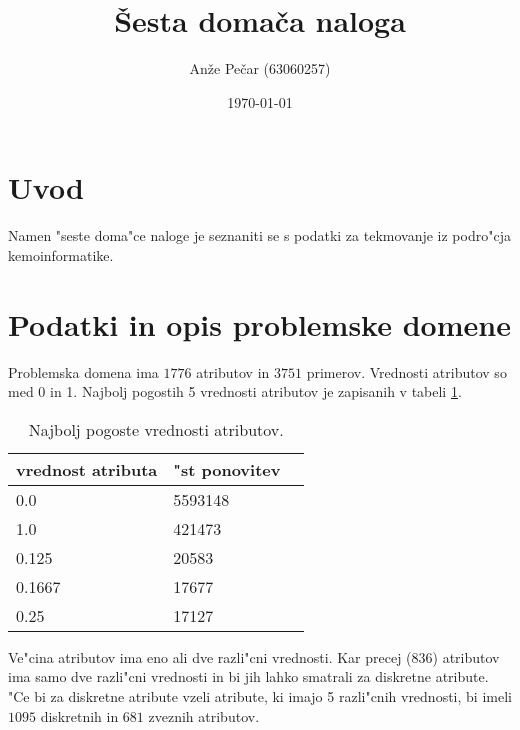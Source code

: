 \documentclass[a4paper,11pt]{article}
\title{Šesta domača naloga}
\author{Anže Pečar (63060257)}
\date{\today}
\begin{document}
\maketitle

\section{Uvod}
Namen "seste doma"ce naloge je seznaniti se s podatki za tekmovanje iz podro"cja kemoinformatike. 

\section{Podatki in opis problemske domene}
Problemska domena ima $1776$ atributov in $3751$ primerov. Vrednosti atributov so med 0 in 1. Najbolj pogostih 5 vrednosti atributov je zapisanih v tabeli \ref{pt}.

\begin{table}[htbp]
\caption{Najbolj pogoste vrednosti atributov.}
\label{pt}
\begin{center}
\begin{tabular}{llp{3cm}}
\hline
vrednost atributa & "st ponovitev \\
\hline
0.0 & 5593148 \\
1.0 & 421473 \\
0.125 & 20583 \\
0.1667 & 17677 \\  
0.25 & 17127 \\
\hline
\end{tabular}
\end{center}

\end{table}





Ve"cina atributov ima eno ali dve razli"cni vrednosti. Kar precej ($836$) atributov ima samo dve razli"cni vrednosti in bi jih lahko smatrali za diskretne atribute. "Ce bi za diskretne atribute vzeli atribute, ki imajo 5 razli"cnih vrednosti, bi imeli $1095$ diskretnih in $681$ zveznih atributov.
\end{document}
